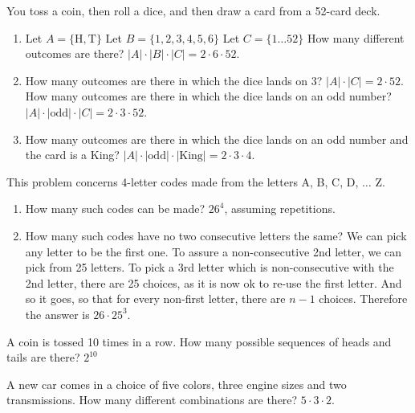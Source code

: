 \documentclass[openany, 11pt]{book}
\begin{document}
\begin{exercise}{}{}
	You toss a coin, then roll a dice, and then draw a card
	from a 52-card deck.
	\begin{enumerate}[label = {(\arabic*)}]
		\item Let $A = \{\text{H}, \text{T}\}$
		      Let $B = \{1, 2, 3, 4, 5, 6\}$
		      Let $C = \{1\ldots 52 \}$
		      How many different outcomes are there?
		      $|A| \cdot |B| \cdot |C| = 2 \cdot 6 \cdot 52$.
		\item How many outcomes are there in which the dice lands on $3$?
		      $|A| \cdot |C| = 2 \cdot 52$.
		      How many outcomes are there in which the dice lands on an odd number?
		      $|A| \cdot |\text{odd}| \cdot |C| = 2 \cdot 3 \cdot 52$.
		\item How many outcomes are there in which the dice lands on an odd number
		      and the card is a King?
		      $|A| \cdot |\text{odd}| \cdot |\text{King}| = 2 \cdot 3 \cdot 4$.
	\end{enumerate}
\end{exercise}

\begin{exercise}{}{}
	This problem concerns 4-letter codes made from the letters A, B, C, D,
	$\ldots$ Z.
	\begin{enumerate}[label = {(\arabic*)}]
		\item How many such codes can be made?
		      $26^4$, assuming repetitions.
		\item How many such codes have no two consecutive letters the same?
		      We can pick any letter to be the first one. To assure a non-consecutive
		      2nd letter, we can pick from 25 letters.  To pick a 3rd letter which is
		      non-consecutive with the 2nd letter, there are 25 choices, as it is now ok
		      to re-use the first letter. And so it goes, so that for every non-first
		      letter, there are $n-1$ choices.
		      Therefore the answer is $26\cdot 25^3$.
	\end{enumerate}
\end{exercise}

\begin{exercise}{}{}
	A coin is tossed 10 times in a row. How many possible
	sequences of heads and tails are there?
	$2^{10}$
\end{exercise}

\begin{exercise}{}{} A new car comes in a choice of five colors, three engine
	sizes and two transmissions. How many different combinations are there?
	$5 \cdot 3 \cdot 2$.
\end{exercise}
\end{document}
